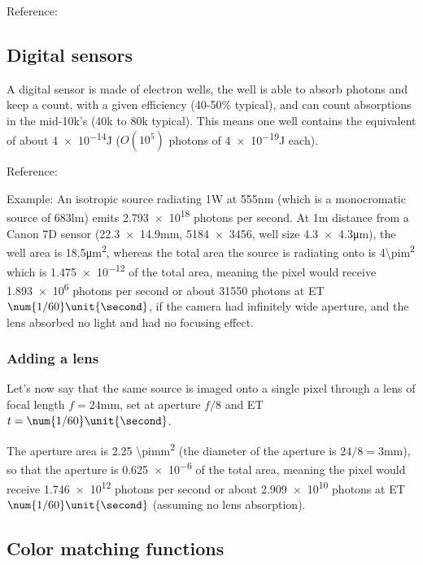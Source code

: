 Reference: 

\subsection{Digital sensors}
A digital sensor is made of electron wells, the well is able to absorb photons
and keep a count, with a given efficiency (40-50\% typical), and can count
absorptions in the mid-10k’s (40k to 80k typical).
This means one well contains the equivalent of about \num{4e-14}\unit{\joule}
($O(10^5)$ photons of \num{4e-19}\unit{\joule} each).

Reference: 

Example:
An isotropic source radiating \num{1}\unit{\watt} at \num{555}\unit{\nano\meter}
(which is a monocromatic source of \num{683}\unit{\lumen}) emits \num{2.793e18} photons per second.
At \num{1}\unit{\meter} distance from a Canon 7D sensor
(\num{22.3 x 14.9}\unit{\milli\meter}, \num{5184 x 3456}\unit{\pixel}, well size \num{4.3 x 4.3}\unit{\micro\meter}),
the well area is \num{18.5}\unit{\square\micro\meter}, whereas the total area the
source is radiating onto
is \num{4\pi}\unit{\square\meter} which is \num{1.475e-12} of the total area, meaning
the pixel would
receive \num{1.893e6} photons per second or about \num{31550} photons at ET
$\num{1/60}\unit{\second}$, if the
camera had infinitely wide aperture, and the lens absorbed no light and had
no focusing effect.

\subsubsection{Adding a lens}
Let's now say that the same source is imaged onto a single pixel through a lens
of
focal length $f = \num{24}\unit{\milli\meter}$, set at aperture $f/8$ and ET $t = \num{1/60}\unit{\second}$.

The aperture area is \num{2.25 \pi}\unit{\square\milli\meter} (the diameter of the
aperture is
$24/8 = \num{3}\unit{\milli\meter}$), so that the aperture is \num{0.625e-6} of the
total area, meaning
the pixel would receive \num{1.746e12} photons per second or about
\num{2.909e10} photons
at ET $\num{1/60}\unit{\second}$ (assuming no lens absorption).
\fi


\subsection{Color matching functions}

